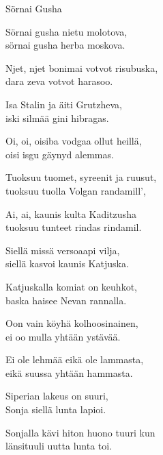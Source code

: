 \begin{song}{Sörnai Gusha}


    \showversenumber	
	Sörnai gusha nietu molotova,\\
	sörnai gusha herba moskova.\\
	\begin{repetition}
		Njet, njet bonimai votvot risubuska,\\
		dara zeva votvot harasoo.
	\end{repetition}
	
    \showversenumber
	Isa Stalin ja äiti Grutzheva,\\
	iski silmää gini hibragas.\\
	\begin{repetition}
		Oi, oi, oisiba vodgaa ollut heillä,\\
		oisi isgu gäynyd alemmas.
	\end{repetition}
	
	\showversenumber
	Tuoksuu tuomet, syreenit ja ruusut,\\
    tuoksuu tuolla Volgan randamill’,\\
    \begin{repetition}
        Ai, ai, kaunis kulta Kaditzusha\\
        tuoksuu tunteet rindas rindamil.
    \end{repetition}
	
    \showversenumber
	Siellä missä versoaapi vilja,\\
	siellä kasvoi kaunis Katjuska.\\
	\begin{repetition}
		Katjuskalla komiat on keuhkot,\\
		baska haisee Nevan rannalla.
	\end{repetition}
	
    \showversenumber
	Oon vain köyhä kolhoosinainen,\\
	ei oo mulla yhtään ystävää.\\
	\begin{repetition}
		Ei ole lehmää eikä ole lammasta,\\
		eikä suussa yhtään hammasta.
	\end{repetition}
	
    \showversenumber
    Siperian lakeus on suuri,\\
    Sonja siellä lunta lapioi.\\
	\begin{repetition}
	    Sonjalla kävi hiton huono tuuri kun\\
        länsituuli uutta lunta toi.
	\end{repetition}


\end{song}
